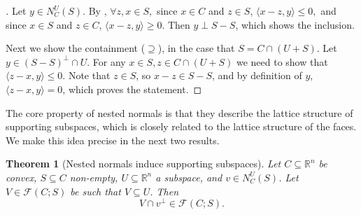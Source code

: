 \documentclass{article}
\theoremstyle{plain}
\newtheorem{theorem}{Theorem}[section]
\theoremstyle{definition}
\theoremstyle{remark}
\begin{document}
\begin{proof}[\hypertarget{loc:normal_cone_everywhere_is_the_orthogonal_subspace.proof}Proof of \Cref{loc:normal_cone_everywhere_is_the_orthogonal_subspace.statement}]

Let $y \in N_C^U(S)$. By , $\forall z, x \in S,$ since $x \in C$ and $z \in S$, $\langle x-z, y\rangle \le 0,$
and since $x \in S$ and $z \in C$, $\langle x-z, y\rangle \ge 0$. Then $y \perp S-S$, which shows the inclusion.

Next we show the containment ($\supseteq$), in the case that $S = C \cap (U+S)$.
Let $y \in (S-S)^\perp \cap U$. For any $x \in S, z \in C \cap (U+S)$ we need to show that $\langle z-x, y\rangle \leq 0$.
Note that $z \in S$, so $x-z  \in S-S$, and by definition of $y$, $\langle z-x,y\rangle=0$, which proves the statement.
\end{proof}
The core property of nested normals is that they describe
the lattice structure of supporting subspaces, which is closely related to the 
lattice structure of the faces. We make this idea precise in the next two results. 
\begin{theorem}[Nested normals induce supporting subspaces]
\label{loc:nested_normals_induce_supporting_subspaces.statement}
Let $C \subseteq \mathbb{R}^n$ be convex, $S \subseteq C$ non-empty, $U \subseteq \mathbb{R}^n$ a subspace, and $v \in N_C^U(S)$. Let $V \in \mathcal{F}(C;S)$ be such that $V \subseteq U$. Then 
\begin{equation*}
V \cap v^\perp \in \mathcal{F}(C;S).
\end{equation*}
\end{theorem}
\end{document}
